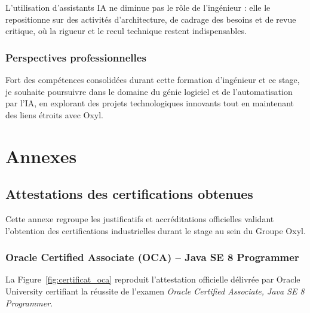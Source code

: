 \documentclass{tnreport}
\def\reportCompany{Oxyl} %
\begin{document}
L'utilisation d'assistants IA ne diminue pas le rôle de l'ingénieur : elle le repositionne sur des activités d'architecture, de cadrage des besoins et de revue critique, où la rigueur et le recul technique restent indispensables.

\section*{Perspectives professionnelles}

Fort des compétences consolidées durant cette formation d'ingénieur et ce stage, je souhaite poursuivre dans le domaine du génie logiciel et de l'automatisation par l'IA, en explorant des projets technologiques innovants tout en maintenant des liens étroits avec \reportCompany{}.

\cleardoublepage
\renewcommand{\tocbibname}{Bibliographie / Webographie}


\cleardoublepage

\listoffigures
\cleardoublepage

\listoftables
\cleardoublepage

\lstlistoflistings
\cleardoublepage

\glsaddall
\printnoidxglossaries

\cleardoublepage
\renewcommand{\thesubsection}{\Roman{subsection}}

\appendix
\part*{Annexes}
\cleardoublepage

\chapter{Attestations des certifications obtenues}
\label{annexe:certifications}

Cette annexe regroupe les justificatifs et accréditations officielles validant l'obtention des certifications industrielles durant le stage au sein du Groupe Oxyl.

\section{Oracle Certified Associate (OCA) -- Java SE 8 Programmer}
\label{annexe:sec_certif_oca}

La Figure~\ref{fig:certificat_oca} reproduit l'attestation officielle délivrée par Oracle University certifiant la réussite de l'examen \textit{Oracle Certified Associate, Java SE 8 Programmer}.
\end{document}
